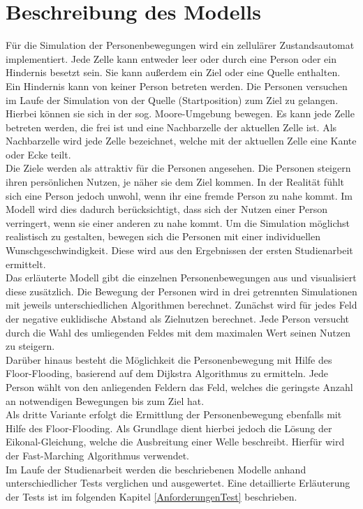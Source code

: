\section{Beschreibung des Modells}
Für die Simulation der Personenbewegungen wird ein zellulärer Zustandsautomat implementiert. Jede Zelle kann entweder leer oder durch eine Person oder ein Hindernis besetzt sein. Sie kann außerdem ein Ziel oder eine Quelle enthalten. Ein Hindernis kann von keiner Person betreten werden. Die Personen versuchen im Laufe der Simulation von der Quelle (Startposition) zum Ziel zu gelangen. Hierbei können sie sich in der sog. Moore-Umgebung bewegen. Es kann jede Zelle betreten werden, die frei ist und eine Nachbarzelle der aktuellen Zelle ist. Als Nachbarzelle wird jede Zelle bezeichnet, welche mit der aktuellen Zelle eine Kante oder Ecke teilt. \\
Die Ziele werden als attraktiv für die Personen angesehen. Die Personen steigern ihren persönlichen Nutzen, je näher sie dem Ziel kommen. In der Realität fühlt sich eine Person jedoch unwohl, wenn ihr eine fremde Person zu nahe kommt. Im Modell wird dies dadurch berücksichtigt, dass sich der Nutzen einer Person verringert, wenn sie einer anderen zu nahe kommt. Um die Simulation möglichst realistisch zu gestalten, bewegen sich die Personen mit einer individuellen Wunschgeschwindigkeit. Diese wird aus den Ergebnissen der ersten Studienarbeit ermittelt. \\
Das erläuterte Modell gibt die einzelnen Personenbewegungen aus und visualisiert diese zusätzlich. Die Bewegung der Personen wird in drei getrennten Simulationen mit jeweils unterschiedlichen Algorithmen berechnet. Zunächst wird für jedes Feld der negative euklidische Abstand als Zielnutzen berechnet. Jede Person versucht durch die Wahl des umliegenden Feldes mit dem maximalen Wert seinen Nutzen zu steigern. \\
Darüber hinaus besteht die Möglichkeit die Personenbewegung mit Hilfe des Floor-Flooding, basierend auf dem Dijkstra Algorithmus zu ermitteln. Jede Person wählt von den anliegenden Feldern das Feld, welches die geringste Anzahl an notwendigen Bewegungen bis zum Ziel hat. \\
Als dritte Variante erfolgt die Ermittlung der Personenbewegung ebenfalls mit Hilfe des Floor-Flooding. Als Grundlage dient hierbei jedoch die Lösung der Eikonal-Gleichung, welche die Ausbreitung einer Welle beschreibt. Hierfür wird der Fast-Marching Algorithmus verwendet.  \\
Im Laufe der Studienarbeit werden die beschriebenen Modelle anhand unterschiedlicher Tests verglichen und ausgewertet. Eine detaillierte Erläuterung der Tests ist im folgenden Kapitel \ref{AnforderungenTest} beschrieben.


